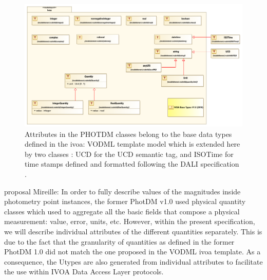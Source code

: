 \documentclass[11pt,a4paper]{ivoa}
\begin{document}
\begin{figure}[H]
\includegraphics[angle=0,width=5.98in ]{./schema/BaseDataTypesDiagram_PR_20220520.png} 
\caption{Attributes in the PHOTDM classes belong to the base data types defined in the ivoa: VODML template model which is extended here by two classes : UCD for the UCD semantic tag, and ISOTime for time stamps defined and formatted following the DALI specification \citep{2017ivoa.spec.0517D} .} 
\end{figure}





\newpage


\newpage

proposal Mireille: 
In order to fully describe values of the magnitudes inside photometry point 
instances, the former PhotDM v1.0 used  physical quantity classes which used to 
aggregate all the basic fields that compose a physical measurement: value, 
error, units, etc. However, within the present specification, we will describe 
individual attributes of the different quantities separately. 
This is due to the fact that the granularity of quantities as defined in the former PhotDM 1.0 did not match the one proposed in the 
VODML ivoa template.  As a consequence,
the Utypes are also generated from individual attributes to facilitate the use within IVOA Data Access Layer protocols.
\par
\end{document}
